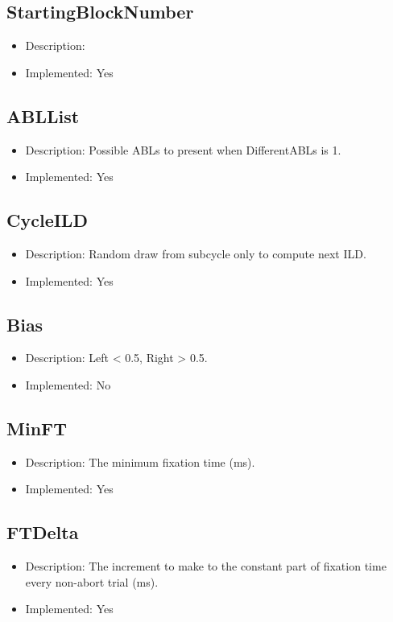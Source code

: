 \subsection*{StartingBlockNumber}
\begin{itemize}
	\item Description: 
	\item Implemented: Yes
\end{itemize}

\subsection*{ABLList}
\begin{itemize}
	\item Description: Possible ABLs to present when DifferentABLs is 1.
	\item Implemented: Yes
\end{itemize}

\subsection*{CycleILD}
\begin{itemize}
	\item Description: Random draw from subcycle only to compute next ILD.
	\item Implemented: Yes
\end{itemize}

\subsection*{Bias}
\begin{itemize}
	\item Description: Left < 0.5, Right > 0.5.
	\item Implemented: No
\end{itemize}

\subsection*{MinFT}
\begin{itemize}
	\item Description: The minimum fixation time (ms).
	\item Implemented: Yes
\end{itemize}

\subsection*{FTDelta}
\begin{itemize}
	\item Description: The increment to make to the constant part of fixation time every non-abort trial (ms).
	\item Implemented: Yes
\end{itemize}


